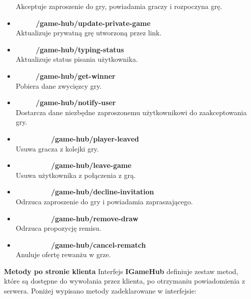 \documentclass[12pt,a4paper]{article}
\begin{document}
\begin{itemize}
    Akceptuje zaproszenie do gry, powiadamia graczy i rozpoczyna grę.
    \item \textbf{\colorbox{orange!90}{\textcolor{white}{PUT}} /game-hub/update-private-game}\\
    Aktualizuje prywatną grę utworzoną przez link.
    \item \textbf{\colorbox{orange!90}{\textcolor{white}{PUT}} /game-hub/typing-status}\\
    Aktualizuje status pisania użytkownika.
    \item \textbf{\colorbox{cyan!90}{\textcolor{white}{GET}} /game-hub/get-winner}\\
    Pobiera dane zwycięzcy gry.
    \item \textbf{\colorbox{cyan!90}{\textcolor{white}{GET}} /game-hub/notify-user}\\
    Dostarcza dane niezbędne zaproszonemu użytkownikowi do zaakceptowania gry.
    \item \textbf{\colorbox{red!90}{\textcolor{white}{DELETE}} /game-hub/player-leaved}\\
    Usuwa gracza z kolejki gry.
    \item \textbf{\colorbox{red!90}{\textcolor{white}{DELETE}} /game-hub/leave-game}\\
    Usuwa użytkownika z połączenia z grą.
    \item \textbf{\colorbox{red!90}{\textcolor{white}{DELETE}} /game-hub/decline-invitation}\\
    Odrzuca zaproszenie do gry i powiadamia zapraszającego.
    \item \textbf{\colorbox{red!90}{\textcolor{white}{DELETE}} /game-hub/remove-draw}\\
    Odrzuca propozycję remisu.
    \item \textbf{\colorbox{red!90}{\textcolor{white}{DELETE}} /game-hub/cancel-rematch}\\
    Anuluje ofertę rewanżu w grze.
\end{itemize}

\newpage

\noindent \textbf{Metody po stronie klienta}
Interfejs \textbf{IGameHub} definiuje zestaw metod, które są dostępne do wywołania przez klienta, po otrzymaniu powiadomienia z serwera. Poniżej wypisano metody zadeklarowane w interfejsie:
\end{document}
